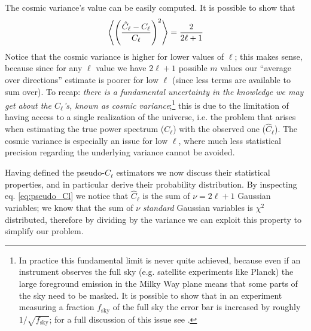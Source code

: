 The cosmic variance's value can be easily computed. It is possible to show that \cite{likelihood_cmb}
\begin{equation*}
    \expval{\left(\frac{\hat{C}_\ell - C_\ell}{C_\ell}\right)^2} = \frac{2}{2\ell + 1}
\end{equation*}
Notice that the cosmic variance is higher for lower values of $\ell$; this makes sense, because since for any $\ell$ value we have $2\ell+1$ possible $m$ values our ``average over directions'' estimate is poorer for low $\ell$ (since less terms are available to sum over).
To recap: \emph{there is a fundamental uncertainty in the knowledge we may get about the $C_\ell$'s, known as cosmic variance};\footnote{In practice this fundamental limit is never quite achieved, because even if an instrument observes the
full sky (e.g. satellite experiments like Planck) the large foreground emission in the Milky Way plane means that some parts of the sky need to be masked. It is possible to show that in an experiment measuring a fraction $f_{\text{sky}}$ of the full sky the error bar is increased by roughly $1/\sqrt{f_{\text{sky}}}$; for a full discussion of this issue see \cite{likelihood_cmb} \cite{modern_cosmology}.} this is due to the limitation of having access to a single realization of the universe, i.e. the problem that arises when estimating the true power spectrum ($C_\ell$) with the observed one ($\hat{C}_\ell$). The cosmic variance is especially an issue for low $\ell$, where much less statistical precision regarding the underlying variance cannot be avoided.

Having defined the pseudo-$C_\ell$ estimators we now discuss their statistical properties, and in particular derive their probability distribution.
By inspecting eq. \eqref{eq:pseudo_Cl} we notice that $\hat{C}_\ell$ is the sum of $\nu = 2\ell+1$ Gaussian variables; we know that the sum of $\nu$ \emph{standard} Gaussian variables is $\chi^2$ distributed, therefore by dividing by the variance we can exploit this property to simplify our problem.


